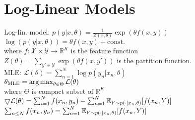 \section{Log-Linear Models}
Log-lin. model: $p(y|x, \theta) = \frac{1}{Z(x, \theta)} \exp(\theta f(x, y))$\\
$\log(p(y | x, \theta)) = \theta f(x, y) + \text{const.}$\\
where $f: \mathcal{X} \times \mathcal{Y} \rightarrow \mathbb{R}^K$ is the feature function\\
$Z(\theta) = \sum_{y' \in \mathcal{Y}} \exp(\theta f(x, y'))$ is the partition function.\\
MLE: $\mathcal{L}(\theta) = \sum_{n=1}^{N}\log p(y_n | x_n, \theta)$\\
$\theta_{\text{MLE}} = \operatorname*{arg\,max}_{\theta \in \Theta} \mathcal{L}(\theta)$\\
where $\Theta$ is compact subset of $\mathbb{R}^K$\\
$\bigtriangledown \mathcal{L}(\theta) = \sum_{i=1}^{N} f(x_n, y_n) - \sum_{n=1}^{N} \mathbb{E}_{Y \sim p(\cdot| x_n, \theta)} [f(x_n, Y)]$\\
$\sum_{n \leq N} f(x_n, y_n) = \sum_{n=1}^{N} \mathbb{E}_{Y \sim p(\cdot | x_n, \theta)} [f(x_n, Y)]$